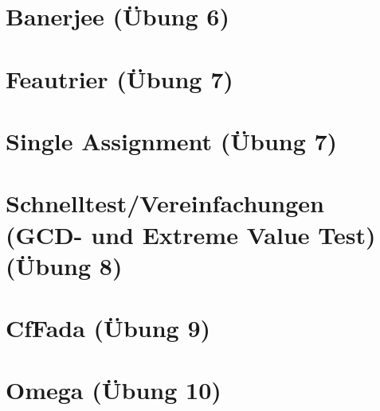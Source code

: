 \documentclass[a4paper,10pt]{article}
\begin{document}
\section{Banerjee (Übung 6)}
\section{Feautrier (Übung 7)}
\section{Single Assignment (Übung 7)}
\section{Schnelltest/Vereinfachungen (GCD- und Extreme Value Test) (Übung 8)}
\section{CfFada (Übung 9)}
\section{Omega (Übung 10)}
\end{document}
